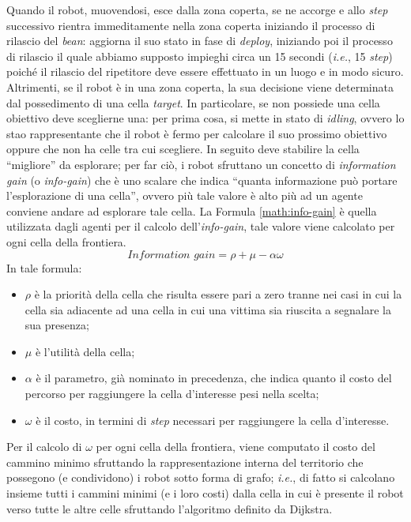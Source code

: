Quando il robot, muovendosi, esce dalla zona coperta, se ne accorge e allo \textit{step} successivo rientra immeditamente nella zona coperta iniziando il processo di rilascio del \textit{bean}: aggiorna il suo stato in fase di \textit{deploy}, iniziando poi il processo di rilascio il quale abbiamo supposto impieghi circa un 15 secondi (\textit{i.e.}, 15 \textit{step}) poiché il rilascio del ripetitore deve essere effettuato in un luogo e in modo sicuro.\\
Altrimenti, se il robot è in una zona coperta, la sua decisione viene determinata dal possedimento di una cella \textit{target}.
In particolare, se non possiede una cella obiettivo deve sceglierne una: per prima cosa, si mette in stato di \textit{idling}, ovvero lo stao rappresentante che il robot è fermo per calcolare il suo prossimo obiettivo oppure che non ha celle tra cui scegliere.
In seguito deve stabilire la cella “migliore” da esplorare; per far ciò, i robot sfruttano un concetto di \textit{information gain} (o \textit{info-gain})  che è uno scalare che indica “quanta informazione può portare l'esplorazione di una cella”, ovvero più tale valore è alto più ad un agente conviene andare ad esplorare tale cella.
La Formula \ref{math:info-gain} è quella utilizzata dagli agenti per il calcolo dell'\textit{info-gain}, tale valore viene calcolato per ogni cella della frontiera.
\begin{equation}
	\label{math:info-gain}
	\textit{Information gain} = \rho+\mu-\alpha\omega
\end{equation}
In tale formula:
\begin{itemize}
	\item $\rho$ è la priorità della cella che risulta essere pari a zero tranne nei casi in cui la cella sia adiacente ad una cella in cui una vittima sia riuscita a segnalare la sua presenza;
	\item $\mu$ è l'utilità della cella;
	\item $\alpha$ è il parametro, già nominato in precedenza, che indica quanto il costo del percorso per raggiungere la cella d'interesse pesi nella scelta;
	\item $\omega$ è il costo, in termini di \textit{step} necessari per raggiungere la cella d'interesse.
\end{itemize}
Per il calcolo di $\omega$ per ogni cella della frontiera, viene computato il costo del cammino minimo sfruttando la rappresentazione interna del territorio che possegono (e condividono) i robot sotto forma di grafo; \textit{i.e.}, di fatto si calcolano insieme tutti i cammini minimi (e i loro costi) dalla cella in cui è presente il robot verso tutte le altre celle sfruttando l'algoritmo definito da Dijkstra.
